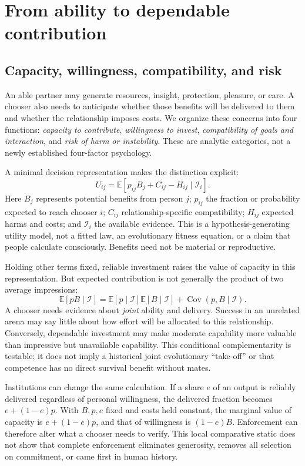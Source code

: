 \documentclass[10pt,twocolumn,letterpaper]{article}
\newcommand{\E}{\mathbb{E}}
\newcommand{\Cov}{\operatorname{Cov}}
\begin{document}
\section{From ability to dependable contribution}
\subsection{Capacity, willingness, compatibility, and risk}
An able partner may generate resources, insight, protection, pleasure, or care. A chooser also needs to anticipate whether those benefits will be delivered to them and whether the relationship imposes costs. We organize these concerns into four functions: \emph{capacity to contribute}, \emph{willingness to invest}, \emph{compatibility of goals and interaction}, and \emph{risk of harm or instability}. These are analytic categories, not a newly established four-factor psychology.

A minimal decision representation makes the distinction explicit:
\begin{equation}
U_{ij}=\E\!\left[p_{ij}B_j+C_{ij}-H_{ij}\mid\mathcal I_i\right].
\label{eq:value}
\end{equation}
Here $B_j$ represents potential benefits from person $j$; $p_{ij}$ the fraction or probability expected to reach chooser $i$; $C_{ij}$ relationship-specific compatibility; $H_{ij}$ expected harms and costs; and $\mathcal I_i$ the available evidence. This is a hypothesis-generating utility model, not a fitted law, an evolutionary fitness equation, or a claim that people calculate consciously. Benefits need not be material or reproductive.

Holding other terms fixed, reliable investment raises the value of capacity in this representation. But expected contribution is not generally the product of two average impressions:
\begin{equation}
\E[pB\mid\mathcal I]=\E[p\mid\mathcal I]\E[B\mid\mathcal I]+\Cov(p,B\mid\mathcal I).
\label{eq:joint}
\end{equation}
A chooser needs evidence about \emph{joint} ability and delivery. Success in an unrelated arena may say little about how effort will be allocated to this relationship. Conversely, dependable investment may make moderate capability more valuable than impressive but unavailable capability. This conditional complementarity is testable; it does not imply a historical joint evolutionary ``take-off'' or that competence has no direct survival benefit without mates.

Institutions can change the same calculation. If a share $e$ of an output is reliably delivered regardless of personal willingness, the delivered fraction becomes $e+(1-e)p$. With $B,p,e$ fixed and costs held constant, the marginal value of capacity is $e+(1-e)p$, and that of willingness is $(1-e)B$. Enforcement can therefore alter what a chooser needs to verify. This local comparative static does not show that complete enforcement eliminates generosity, removes all selection on commitment, or came first in human history.
\end{document}
